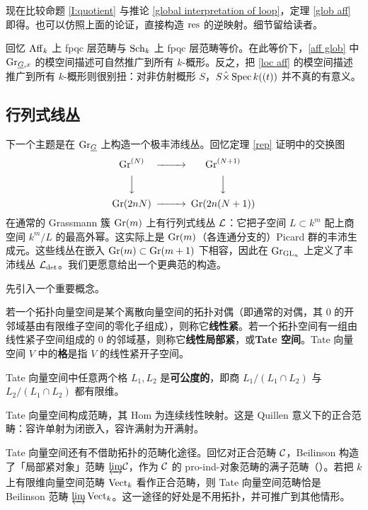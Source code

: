 现在比较命题 \ref{I:quotient} 与推论 \ref{global interpretation of loop}，定理 \ref{glob aff} 即得。也可以仿照上面的论证，直接构造 $\operatorname{res}$ 的逆映射。细节留给读者。

\begin{rmk}
回忆 ${\operatorname{Aff}}_k$ 上 fpqc 层范畴与 $\operatorname{Sch}_k$ 上 fpqc 层范畴等价。在此等价下，\eqref{aff glob} 中 ${\operatorname{Gr}}_{\underline G,x}$ 的模空间描述可自然推广到所有 $k$-概形。反之，把 \eqref{loc aff} 的模空间描述推广到所有 $k$-概形则很别扭：对非仿射概形 $S$，$S\hat{\times} \operatorname{Spec} k((t))$ 并不真的有意义。
\end{rmk}

\subsection{行列式线丛}\label{determinant line}

下一个主题是在 ${\operatorname{Gr}}_{\underline G}$ 上构造一个极丰沛线丛。回忆定理 \ref{rep} 证明中的交换图
\[\begin{CD}
\Gr^{(N)}@>>>\Gr^{(N+1)}\\
@VVV@VVV\\
\Gr(2nN)@>>>\Gr(2n(N+1))
\end{CD}\]
在通常的 Grassmann 簇 ${\operatorname{Gr}}(m)$ 上有行列式线丛 ${\mathcal L}$：它把子空间 $L\subset k^m$ 配上商空间 $k^m/L$ 的最高外幂。这实际上是 ${\operatorname{Gr}}(m)$（各连通分支的）Picard 群的丰沛生成元。这些线丛在嵌入 ${\operatorname{Gr}}(m)\subset {\operatorname{Gr}}(m+1)$ 下相容，因此在 ${\operatorname{Gr}}_{{\operatorname{GL}}_n}$ 上定义了丰沛线丛 ${\mathcal L}_{\det}$。我们更愿意给出一个更典范的构造。

先引入一个重要概念。

\begin{dfn}
若一个拓扑向量空间是某个离散向量空间的拓扑对偶（即通常的对偶，其 $0$ 的开邻域基由有限维子空间的零化子组成），则称它\textbf{线性紧}。若一个拓扑空间有一组由线性紧子空间组成的 $0$ 的邻域基，则称它\textbf{线性局部紧}，或\textbf{Tate 空间}。Tate 向量空间 $V$ 中的\textbf{格}是指 $V$ 的线性紧开子空间。
\end{dfn}

Tate 向量空间中任意两个格 $L_1, L_2$ 是\textbf{可公度的}，即商 $L_1/(L_1 \cap L_2)$ 与 $L_2/(L_1 \cap L_2)$ 都有限维。

\begin{rmk}\label{exact str}
Tate 向量空间构成范畴，其 Hom 为连续线性映射。这是 Quillen 意义下的正合范畴：容许单射为闭嵌入，容许满射为开满射。

Tate 向量空间还有不借助拓扑的范畴化途径。回忆对正合范畴 ${\mathcal C}$，Beilinson 构造了「局部紧对象」范畴 $\underleftrightarrow{\lim} {\mathcal C}$，作为 ${\mathcal C}$ 的 pro-ind-对象范畴的满子范畴（\cite[Appendix]{Be}）。若把 $k$ 上有限维向量空间范畴 $\operatorname{Vect}_k$ 看作正合范畴，则 Tate 向量空间范畴恰是 Beilinson 范畴 $\underleftrightarrow{\lim}\operatorname{Vect}_k$。这一途径的好处是不用拓扑，并可推广到其他情形。
\end{rmk}

